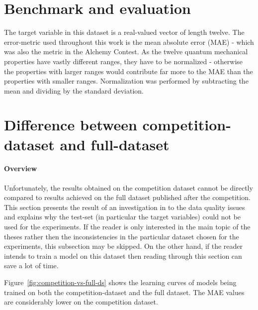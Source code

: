 


\section{Benchmark and evaluation}

The target variable in this dataset is a real-valued vector of length twelve. The error-metric used throughout this work is the mean absolute error (MAE) - which was also the metric in the Alchemy Contest. As the twelve quantum mechanical properties have vastly different ranges, they have to be normalized - otherwise the properties with larger ranges would contribute far more to the MAE than the properties with smaller ranges. Normalization was performed by subtracting the mean and dividing by the standard deviation.

\section{Difference between competition-dataset and full-dataset}
\label{sec:diff-old-new-ds}


\paragraph{Overview} Unfortunately, the results obtained on the competition dataset cannot be directly compared to results achieved on the full dataset published after the competition. This section presents the result of an investigation in to the data quality issues and explains why the test-set (in particular the target variables) could not be used for the experiments. If the reader is only interested in the main topic of the theses rather then the inconsistencies in the particular dataset chosen for the experiments, this subsection may be skipped. On the other hand, if the reader intends to train a model on this dataset then reading through this section can save a lot of time.

Figure~\ref{fig:competition-vs-full-ds} shows the learning curves of models being trained on both the competition-dataset and the full dataset. The MAE values are considerably lower on the competition dataset.


